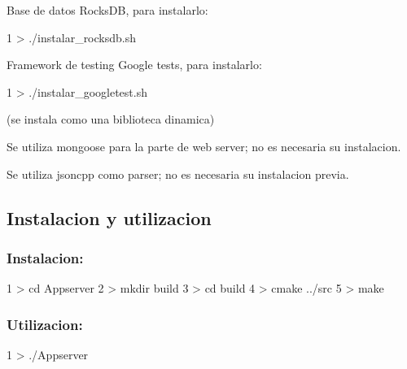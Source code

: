 Base de datos Rocks\+DB, para instalarlo\+:


\begin{DoxyCode}
1 > ./instalar\_rocksdb.sh
\end{DoxyCode}


Framework de testing Google tests, para instalarlo\+:


\begin{DoxyCode}
1 > ./instalar\_googletest.sh
\end{DoxyCode}


(se instala como una biblioteca dinamica)

Se utiliza mongoose para la parte de web server; no es necesaria su instalacion.

Se utiliza jsoncpp como parser; no es necesaria su instalacion previa.

\subsection*{Instalacion y utilizacion}

\subsubsection*{Instalacion\+:}


\begin{DoxyCode}
1 > cd Appserver
2 > mkdir build
3 > cd build
4 > cmake ../src
5 > make
\end{DoxyCode}


\subsubsection*{Utilizacion\+:}


\begin{DoxyCode}
1 > ./Appserver
\end{DoxyCode}
 